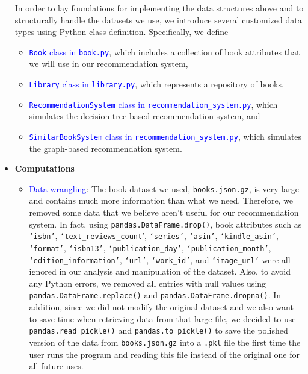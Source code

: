 \documentclass[fontsize=11pt]{article}
\begin{document}
\begin{itemize}
In order to lay foundations for implementing the data structures above and to structurally handle the datasets we use, we introduce several customized data types using Python class definition. Specifically, we define
\begin{itemize}
    \item \textcolor{blue}{\texttt{Book} class in \texttt{book.py}}, which includes a collection of book attributes that we will use in our recommendation system,
    \item \textcolor{blue}{\texttt{Library} class in \texttt{library.py}}, which represents a repository of books,
    \item \textcolor{blue}{\texttt{RecommendationSystem} class in \texttt{recommendation\_system.py}}, which simulates the decision-tree-based recommendation system, and
    \item \textcolor{blue}{\texttt{SimilarBookSystem} class in \texttt{recommendation\_system.py}}, which simulates the graph-based recommendation system.
\end{itemize}

\item \textbf{Computations}
\begin{itemize}
    \item \textcolor{blue}{Data wrangling}: The book dataset we used, \texttt{books.json.gz}, is very large and contains much more information than what we need. Therefore, we removed some data that we believe aren’t useful for our recommendation system. In fact, using \texttt{pandas.DataFrame.drop()}, book attributes such as \texttt{`isbn'}, \texttt{`text\_reviews\_count}', \texttt{`series'}, \texttt{`asin'}, \texttt{`kindle\_asin'}, \texttt{`format'}, \texttt{`isbn13'}, \texttt{`publication\_day'}, \texttt{`publication\_month'}, \texttt{`edition\_information'}, \texttt{`url'},  \texttt{`work\_id'}, and \texttt{`image\_url'} were all ignored in our analysis and manipulation of the dataset. Also, to avoid any Python errors, we removed all entries with null values using \texttt{pandas.DataFrame.replace()} and \texttt{pandas.DataFrame.dropna()}. In addition, since we did not modify the original dataset and we also want to save time when retrieving data from that large file, we decided to use \texttt{pandas.read\_pickle()} and \texttt{pandas.to\_pickle()} to save the polished version of the data from \texttt{books.json.gz} into a \texttt{.pkl} file the first time the user runs the program and reading this file instead of the original one for all future uses.


\end{itemize}
\end{itemize}
\end{document}
